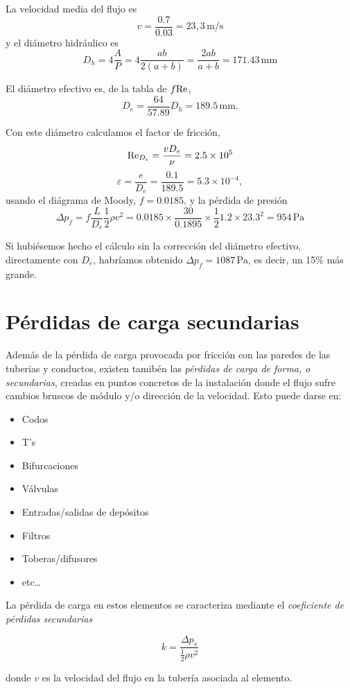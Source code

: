 La velocidad media del flujo es
\[
v = \frac{0.7}{0.03} = 23,3 \, \text{m/s}
\]
y el diámetro hidráulico es
\[
D_h = 4\frac{A}{P}=4\frac{ab}{2(a+b)}=\frac{2ab}{a+b}=171.43\,\text{mm}
\]

El diámetro efectivo es, de la tabla de $f\text{Re}$,
\[
D_e = \frac{64}{57.89}D_h = 189.5\,\text{mm}.
\]

Con este diámetro calculamos el factor de fricción,
\[
\text{Re}_{D_e}=\frac{v D_e}{\nu} = 2.5\times 10^5
\]
\[
\varepsilon = \frac{e}{D_e}=\frac{0.1}{189.5}=5.3\times10^{-4},
\]
usando el diágrama de Moody, $f=0.0185$, y la pérdida de presión
\[
\Delta p_f = f \frac{L}{D_e}\frac{1}{2}\rho v^2= 0.0185\times \frac{30}{0.1895}\times\frac{1}{2}1.2\times23.3^2 = 954\,\text{Pa}
\]

Si hubiésemos hecho el cálculo sin la corrección del diámetro efectivo, directamente con $D_e$, habríamos obtenido $\Delta p_f = 1087\,\text{Pa}$, es decir, un 15\% más grande. 

\section{Pérdidas de carga secundarias}

Además de la pérdida de carga provocada por fricción con las paredes de las tuberias y conductos, existen tamibén las {\it pérdidas de carga de forma, o secundarias}, creadas en puntos concretos de la instalación donde el flujo sufre cambios bruscos de módulo y/o dirección de la velocidad. Esto puede darse en:
\begin{itemize}
	\item Codos
	\item T's
	\item Bifurcaciones
	\item Válvulas
	\item Entradas/salidas de depósitos
	\item Filtros
	\item Toberas/difusores
	\item etc\ldots
\end{itemize}  

La pérdida de carga en estos elementos se caracteriza mediante el \textit{coeficiente de pérdidas secundarias}

\begin{equation}
	k = \frac{\Delta p_s}{\frac{1}{2}\rho v^2}
\end{equation}

donde $v$ es la velocidad del flujo en la tuber\'ia asociada al elemento.


